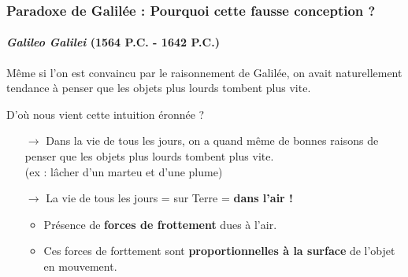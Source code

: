 \documentclass[usenames, dvipsnames]{beamer}
\begin{document}
\begin{frame}[plain]
\frametitle{Paradoxe de Galilée : Pourquoi cette fausse conception ?}
\framesubtitle{\textit{Galileo Galilei} (1564 P.C. - 1642 P.C.)}

Même si l'on est convaincu par le raisonnement de Galilée, on avait naturellement tendance à penser que les objets plus lourds tombent plus vite.

D'où nous vient cette intuition éronnée ?

\begin{itemize}
\item[$\boldsymbol{\rightarrow}$] Dans la vie de tous les jours, on a quand même de bonnes raisons de penser que les objets plus lourds tombent plus vite. \\ (ex : lâcher d'un marteu et d'une plume)
\item[$\boldsymbol{\rightarrow}$] La vie de tous les jours = sur Terre = \textbf{dans l'air !}
\begin{itemize}
\item Présence de \textbf{forces de frottement} dues à l'air.
\item Ces forces de forttement sont \textbf{proportionnelles à la surface} de l'objet en mouvement.
\end{itemize}
\end{itemize}

\end{frame}
\end{document}
